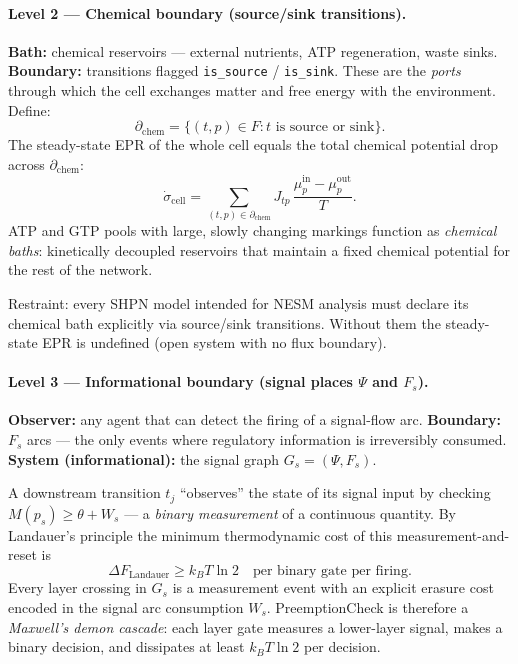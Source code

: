 \documentclass[11pt,a4paper]{article}
\begin{document}
\paragraph{Level 2 --- Chemical boundary (source/sink transitions).}
\textbf{Bath:} chemical reservoirs --- external nutrients, ATP regeneration,
waste sinks.
\textbf{Boundary:} transitions flagged \texttt{is\_source} / \texttt{is\_sink}.
These are the \emph{ports} through which the cell exchanges matter and free
energy with the environment.  Define:
\[
  \partial_{\mathrm{chem}}
    = \{(t,p) \in F : t \text{ is source or sink}\}.
\]
The steady-state EPR of the whole cell equals the total chemical potential
drop across $\partial_{\mathrm{chem}}$:
\[
  \dot\sigma_{\mathrm{cell}}
    = \sum_{(t,p)\in\partial_{\mathrm{chem}}}
        J_{tp}\,\frac{\mu_p^{\mathrm{in}} - \mu_p^{\mathrm{out}}}{T}.
\]
ATP and GTP pools with large, slowly changing markings function as
\emph{chemical baths}: kinetically decoupled reservoirs that maintain a
fixed chemical potential for the rest of the network.

\noindent Restraint: every SHPN model intended for NESM analysis must declare
its chemical bath explicitly via source/sink transitions.  Without them the
steady-state EPR is undefined (open system with no flux boundary).

\paragraph{Level 3 --- Informational boundary (signal places $\Psi$ and $F_s$).}
\textbf{Observer:} any agent that can detect the firing of a signal-flow arc.
\textbf{Boundary:} $F_s$ arcs --- the only events where regulatory information
is irreversibly consumed.
\textbf{System (informational):} the signal graph $G_s = (\Psi, F_s)$.

A downstream transition $t_j$ ``observes'' the state of its signal input by
checking $M(p_s) \geq \theta + W_s$ --- a \emph{binary measurement} of a
continuous quantity.  By Landauer's principle the minimum thermodynamic cost
of this measurement-and-reset is
\[
  \Delta F_{\mathrm{Landauer}} \geq k_BT \ln 2
  \quad \text{per binary gate per firing.}
\]
Every layer crossing in $G_s$ is a measurement event with an explicit
erasure cost encoded in the signal arc consumption $W_s$.
PreemptionCheck is therefore a \emph{Maxwell's demon cascade}: each layer
gate measures a lower-layer signal, makes a binary decision, and dissipates
at least $k_BT \ln 2$ per decision.
\end{document}
